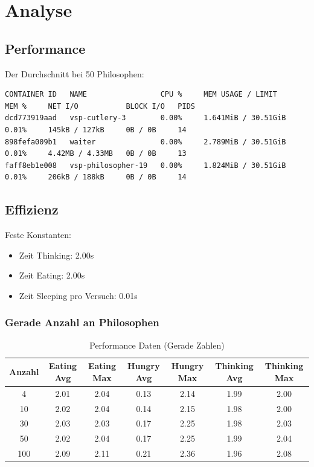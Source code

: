 \section{Analyse}

\subsection{Performance}

Der Durchschnitt bei 50 Philosophen:

\begin{verbatim}
CONTAINER ID   NAME                 CPU %     MEM USAGE / LIMIT     MEM %     NET I/O           BLOCK I/O   PIDS
dcd773919aad   vsp-cutlery-3        0.00%     1.641MiB / 30.51GiB   0.01%     145kB / 127kB     0B / 0B     14
898fefa009b1   waiter               0.00%     2.789MiB / 30.51GiB   0.01%     4.42MB / 4.33MB   0B / 0B     13
faff8eb1e008   vsp-philosopher-19   0.00%     1.824MiB / 30.51GiB   0.01%     206kB / 188kB     0B / 0B     14
\end{verbatim}

\subsection{Effizienz}

Feste Konstanten:
\begin{itemize}
    \item Zeit Thinking: 2.00s
    \item Zeit Eating: 2.00s
    \item Zeit Sleeping pro Versuch: 0.01s
\end{itemize}

\subsubsection{Gerade Anzahl an Philosophen}

\begin{table}[h!]
\centering
\begin{tabular}{|c|c|c|c|c|c|c|}
\hline
Anzahl & Eating Avg & Eating Max & Hungry Avg & Hungry Max & Thinking Avg & Thinking Max \\
\hline
4 & 2.01 & 2.04 & 0.13 & 2.14 & 1.99 & 2.00 \\
10 & 2.02 & 2.04 & 0.14 & 2.15 & 1.98 & 2.00 \\
30 & 2.03 & 2.03 & 0.17 & 2.25 & 1.98 & 2.03 \\
50 & 2.02 & 2.04 & 0.17 & 2.25 & 1.99 & 2.04 \\
100 & 2.09 & 2.11 & 0.21 & 2.36 & 1.96 & 2.08 \\
\hline
\end{tabular}
\caption{Performance Daten (Gerade Zahlen)}
\label{tab:performance_data_even}
\end{table}

